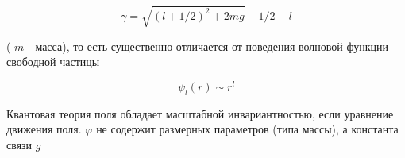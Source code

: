 \documentclass[10pt]{article}
\begin{document}
\[

\gamma=\sqrt{(l+1 / 2)^{2}+2 m g}-1 / 2-l

\]



( $m$ - масса), то есть существенно отличается от поведения волновой функции свободной частицы



\[

\psi_{l}(r) \sim r^{l}

\]



Квантовая теория поля обладает масштабной инвариантностью, если уравнение движения поля. $\varphi$ не содержит размерных параметров (типа массы), а константа связи $g$
\end{document}
